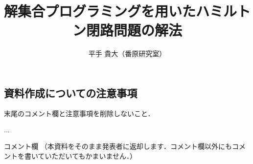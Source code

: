\documentclass[a4j,10pt]{jarticle}
\title{解集合プログラミングを用いたハミルトン閉路問題の解法}
\author{平手 貴大（番原研究室）}
\date{}
\begin{document}
\maketitle
\thispagestyle{empty}
\begin{multicols}{1}

\section{資料作成についての注意事項}

末尾のコメント欄と注意事項を削除しないこと．

\begin{thebibliography}{10}

 ...

\end{thebibliography}

\end{multicols}
\vfill
\noindent
{\gt コメント欄}
{\footnotesize
（本資料をそのまま発表者に返却します．コメント欄以外にもコメントを書いていただいてもかまいません．）}
\\
\fbox{\begin{minipage}{\textwidth}\noindent\\\\\end{minipage}}	
\end{document}

